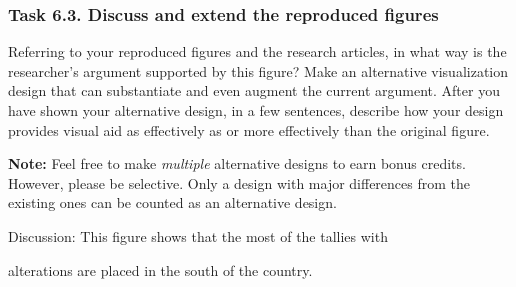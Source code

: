 \documentclass[
]{article}
\begin{document}
\clearpage

\hypertarget{task-6.3.-discuss-and-extend-the-reproduced-figures}{%
\subsubsection{Task 6.3. Discuss and extend the reproduced
figures}\label{task-6.3.-discuss-and-extend-the-reproduced-figures}}

Referring to your reproduced figures and the research articles, in what
way is the researcher's argument supported by this figure? Make an
alternative visualization design that can substantiate and even augment
the current argument. After you have shown your alternative design, in a
few sentences, describe how your design provides visual aid as
effectively as or more effectively than the original figure.

\textbf{Note:} Feel free to make \emph{multiple} alternative designs to
earn bonus credits. However, please be selective. Only a design with
major differences from the existing ones can be counted as an
alternative design.

Discussion: This figure shows that the most of the tallies with

alterations are placed in the south of the country.
\end{document}
